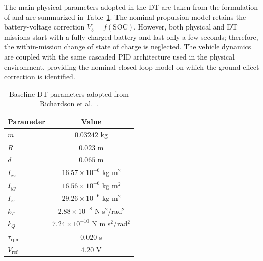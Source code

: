 \documentclass[journal]{IEEEtran}
\begin{document}
The main physical parameters adopted in the DT are taken from the formulation of \cite{Richardson2025} and are summarized in Table~\ref{tab:dt_parameters}. The nominal propulsion model retains the battery-voltage correction $V_b=f(\mathrm{SOC})$. However, both physical and DT missions start with a fully charged battery and last only a few seconds; therefore, the within-mission change of state of charge is neglected. The vehicle dynamics are coupled with the same cascaded PID architecture used in the physical environment, providing the nominal closed-loop model on which the ground-effect correction is identified.
\begin{table}[t]
\centering
\caption{Baseline DT parameters adopted from Richardson et al.~\cite{Richardson2025}.}
\label{tab:dt_parameters}
\begin{tabular}{lc}
\hline
Parameter & Value \\
\hline
$m$ & $0.03242$ kg\\
$R$ & $0.023$ m \\
$d$ & $0.065$ m \\
$I_{xx}$ & $16.57\times10^{-6}$ kg m$^2$ \\
$I_{yy}$ & $16.56\times10^{-6}$ kg m$^2$ \\
$I_{zz}$ & $29.26\times10^{-6}$ kg m$^2$ \\
$k_T$ & $2.88\times10^{-8}$ N s$^2$/rad$^2$ \\
$k_Q$ & $7.24\times10^{-10}$ N m s$^2$/rad$^2$ \\
$\tau_{\mathrm{rpm}}$ & $0.020$ s \\
$V_{\mathrm{ref}}$ & $4.20$ V \\
\hline
\end{tabular}
\end{table}
\end{document}
